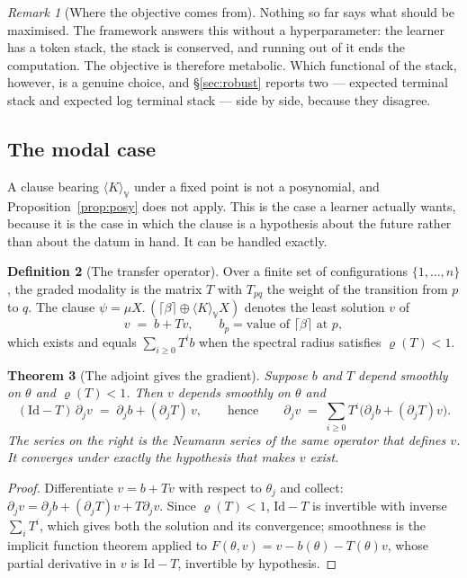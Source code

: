 \documentclass[11pt,a4paper]{article}
\theoremstyle{plain}
\newtheorem{theorem}{Theorem}[section]
\theoremstyle{definition}
\newtheorem{definition}[theorem]{Definition}
\theoremstyle{remark}
\newtheorem{remark}[theorem]{Remark}
\newcommand{\V}{\mathbb{V}}
\newcommand{\sumv}{\oplus}
\newcommand{\crisp}[1]{\lceil #1 \rceil}
\begin{document}
\begin{remark}[Where the objective comes from]\label{rem:objective}
Nothing so far says what should be maximised. The framework answers this without
a hyperparameter: the learner has a token stack, the stack is conserved, and
running out of it ends the computation. The objective is therefore metabolic.
Which functional of the stack, however, is a genuine choice, and
\S\ref{sec:robust} reports two --- expected terminal stack and expected log
terminal stack --- side by side, because they disagree.
\end{remark}

\subsection{The modal case}\label{ssec:modal}

A clause bearing $\langle K\rangle_\V$ under a fixed point is not a posynomial,
and Proposition~\ref{prop:posy} does not apply. This is the case a learner
actually wants, because it is the case in which the clause is a hypothesis about
the future rather than about the datum in hand. It can be handled exactly.

\begin{definition}[The transfer operator]\label{def:transfer}
Over a finite set of configurations $\{1,\dots,n\}$, the graded modality is the
matrix $T$ with $T_{pq}$ the weight of the transition from $p$ to $q$. The clause
$\psi = \mu X.\,(\crisp{\beta} \sumv \langle K\rangle_\V X)$ denotes the least
solution $v$ of
\[
v \;=\; b + Tv, \qquad b_p = \text{value of } \crisp{\beta} \text{ at } p,
\]
which exists and equals $\sum_{i\ge0} T^i b$ when the spectral radius satisfies
$\varrho(T) < 1$.
\end{definition}

\begin{theorem}[The adjoint gives the gradient]\label{thm:adjoint}
Suppose $b$ and $T$ depend smoothly on $\theta$ and $\varrho(T) < 1$. Then $v$
depends smoothly on $\theta$ and
\[
(\mathrm{Id} - T)\,\partial_j v \;=\; \partial_j b + (\partial_j T)\,v ,
\qquad\text{hence}\qquad
\partial_j v \;=\; \sum_{i \ge 0} T^i\bigl(\partial_j b + (\partial_j T) v\bigr).
\]
The series on the right is the Neumann series of the same operator that defines
$v$. It converges under exactly the hypothesis that makes $v$ exist.
\end{theorem}

\begin{proof}
Differentiate $v = b + Tv$ with respect to $\theta_j$ and collect: $\partial_j v
= \partial_j b + (\partial_j T)v + T \partial_j v$. Since $\varrho(T)<1$,
$\mathrm{Id}-T$ is invertible with inverse $\sum_i T^i$, which gives both the
solution and its convergence; smoothness is the implicit function theorem applied
to $F(\theta,v) = v - b(\theta) - T(\theta)v$, whose partial derivative in $v$ is
$\mathrm{Id}-T$, invertible by hypothesis.
\end{proof}
\end{document}
